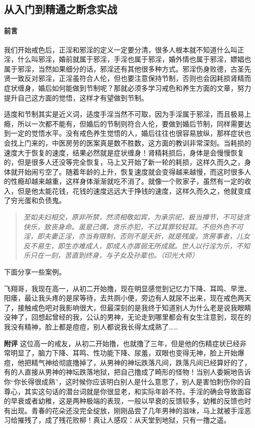 \subsection{从入门到精通之断念实战}\label{84}

\paragraph*{前言}

我们开始戒色后，正淫和邪淫的定义一定要分清，很多人根本就不知道什么叫正淫，什么叫邪淫，婚前就属于邪淫，手淫也属于邪淫，婚外情也属于邪淫，嫖娼也属于邪淫，当然如果细分的话，邪淫还有其他很多种方式。邪淫伤身败德，古圣先贤一致反对邪淫，正淫虽符合人伦，但也要注意保持节制，否则也会因耗损肾精而症状缠身，婚后如何能做到节制呢？那就必须多学习戒色和养生方面的文章，努力提升自己这方面的觉悟，这样才有望做到节制。

适度和节制其实是近义词，适度手淫当然不可取，因为手淫属于邪淫，而且极易上瘾，所以一次都不能有，但婚后的节制则符合人伦，要做到婚后节制，同样需要达到一定的觉悟水平。没有戒色养生觉悟的人，婚后往往也很容易放纵，那样症状也会找上门来的，中医房劳的医案真是数不胜数，这方面的教训非常深刻。当耗损的速度大于恢复的速度，结果必然就是症状缠身！肾精耗损后，身体是会慢慢恢复的，但是很多人还没等完全恢复，马上又开始了新一轮的耗损，这样久而久之，身体就开始闹亏空了。随着年龄的上升，恢复速度就会变得越来越慢，而这时很多人的性瘾却越来越重，这样身体渐渐就吃不消了。就像一个败家子，虽然有一定的收入，但是他太能花钱，花钱的速度远远大于挣钱的速度，这样久而久之，他就变成了穷光蛋和负债鬼。

\begin{quote}\it
    至如夫妇相交，原非所禁，然须相敬如宾，为承宗祀，极当撙节，不可徒贪快乐，致丧身命。虽是己偶，贪乐亦犯，不过其罪较轻耳。不但外色不可淫，即夫妻正淫，亦当有限制，否则不是夭折，就是残废。贪房事者，儿女反不易生，即生亦难成人，即成人亦孱弱无所成就。世人以行淫为乐，不知乐只在一刻，苦直到终身，与子女及孙辈也。（印光大师）
\end{quote}

下面分享一些案例。

\begin{case}
    飞翔哥，我现在高一，从初二开始撸，现在明显感觉到记忆力下降、耳鸣、早泄、阳痿，最让我头疼的是尿等待，去共厕小便，旁边有人就尿不出来，现在戒色两天了，接触戒色吧对我影响很大，但最深刻的是我终于知道别人为什么老是说我眼睛没神了，回想起曾经的我，公认的男神，无论走到哪里都会有女生注意到，现在的我没有精神，脸上都是痘痘，别人都说我长得太成熟了……

    \textbf{附评} 这位高一的戒友，从初二开始撸，也就撸了三年，但是他的伤精症状已经非常明显了，脑力下降、耳鸣、性功能下降、尿羞，双眼也变得无神，脸上开始爆痘，他把精气神给彻底撸掉了，从男神的神坛跌落凡间，跌落凡间已经算好的了，有的人直接从男神的神坛跌落地狱，把自己撸成了畸形的怪物！当别人委婉地告诉你“你长得很成熟”，这时候你应该明白别人是什么意思了，别人是害怕刺伤你的自尊心，其实这句话的潜台词就是你很显老，和实际年龄不符。手淫的确会导致面容的早衰或者幼稚，这是两种极端的表现，一般以早衰的反馈较多，幼稚的反馈也时有出现。青春的花朵还没完全绽放，刚刚品尝了几年男神的滋味，马上就被手淫恶习给摧残了，成了残花败柳！真让人感叹：从天堂到地狱，只有一撸之遥。
\end{case}

